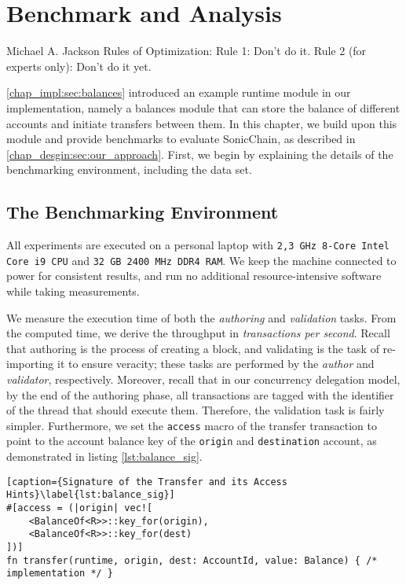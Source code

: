 \chapter{Benchmark and Analysis}  \label{chap:bench_analysis}

\begin{chapquote}{Michael A. Jackson}
    Rules of Optimization:
    Rule 1: Don't do it.
    Rule 2 (for experts only): Don't do it yet.
\end{chapquote}

\ref{chap_impl:sec:balances} introduced an example runtime module in our implementation, namely a
balances module that can store the balance of different accounts and initiate transfers between
them. In this chapter, we build upon this module and provide benchmarks to evaluate SonicChain, as
described in \ref{chap_desgin:sec:our_approach}. First, we begin by explaining the details of the
benchmarking environment, including the data set.

\section{The Benchmarking Environment}

All experiments are executed on a personal laptop with \texttt{2,3 GHz 8-Core Intel Core i9 CPU} and
\texttt{32 GB 2400 MHz DDR4 RAM}. We keep the machine connected to power for consistent results, and
run no additional resource-intensive software while taking measurements.

We measure the execution time of both the \textit{authoring} and \textit{validation} tasks. From the
computed time, we derive the throughput in \textit{transactions per second}. Recall that authoring
is the process of creating a block, and validating is the task of re-importing it to ensure
veracity; these tasks are performed by the \textit{author} and \textit{validator}, respectively.
Moreover, recall that in our concurrency delegation model, by the end of the authoring phase, all
transactions are tagged with the identifier of the thread that should execute them. Therefore, the
validation task is fairly simpler. Furthermore, we set the \texttt{access} macro of the transfer
transaction to point to the account balance key of the \texttt{origin} and \texttt{destination}
account, as demonstrated in listing \ref{lst:balance_sig}.

\begin{lstlisting}[caption={Signature of the Transfer and its Access Hints}\label{lst:balance_sig}]
#[access = (|origin| vec![
    <BalanceOf<R>>::key_for(origin),
    <BalanceOf<R>>::key_for(dest)
])]
fn transfer(runtime, origin, dest: AccountId, value: Balance) { /* implementation */ }
\end{lstlisting}

